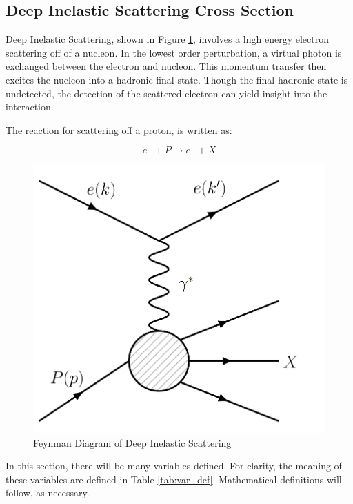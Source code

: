 
\subsection{Deep Inelastic Scattering Cross Section}

Deep Inelastic Scattering, shown in Figure \ref{fig:feyn_dis}, involves a high energy electron scattering off of a nucleon. In the lowest order perturbation, a virtual photon is exchanged between the electron and nucleon. This momentum transfer then excites the nucleon into a hadronic final state. Though the final hadronic state is undetected, the detection of the scattered electron can yield insight into the interaction.

The reaction for scattering off a proton, is written as:

\begin{equation*}
	e^- + P \rightarrow e^- + X
\end{equation*}

\begin{figure}
\begin{center}
\includegraphics[width=.5\textwidth]{./scattering/fig/feyn_dis.png}
\caption{Feynman Diagram of Deep Inelastic Scattering}
\label{fig:feyn_dis}
\end{center}
\end{figure}

In this section, there will be many variables defined. For clarity, the meaning of these variables are defined in Table \ref{tab:var_def}. Mathematical definitions will follow, as necessary.

